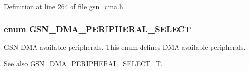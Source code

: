 Definition at line 264 of file gsn\_\-dma.h.

\hypertarget{a00645_ga6b06d19717ade6dfd815a84e83d2388c}{
\subsubsection[{GSN\_\-DMA\_\-PERIPHERAL\_\-SELECT}]{\setlength{\rightskip}{0pt plus 5cm}enum {\bf GSN\_\-DMA\_\-PERIPHERAL\_\-SELECT}}}
\label{a00645_ga6b06d19717ade6dfd815a84e83d2388c}


GSN DMA available peripherals. This enum defines DMA available peripherals. 

\begin{DoxySeeAlso}{See also}
\hyperlink{a00645_gab17cf1a2935d52f5490128aeddd1eb07}{GSN\_\-DMA\_\-PERIPHERAL\_\-SELECT\_\-T}. 
\end{DoxySeeAlso}
